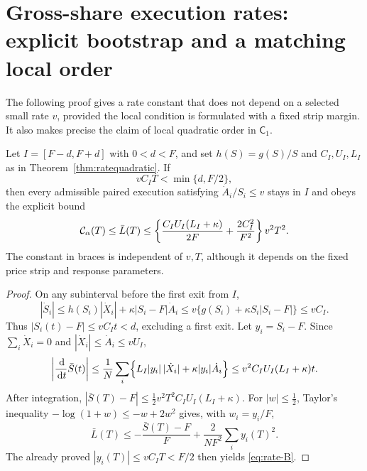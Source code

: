 \documentclass[review,hidelinks,onefignum,onetabnum]{siamonline250211}%
\begin{document}
\section{Gross-share execution rates: explicit bootstrap and a matching local order}
\label{app:rates}
The following proof gives a rate constant that does not depend
on a selected small rate $v$, provided the local condition is
formulated with a fixed strip margin. It also makes precise the
claim of local quadratic order in $\mathsf C_1$.

\begin{proposition}
\label{prop:rate-explicit}
Let $I=[F-d,F+d]$ with $0<d<F$, and set
$h(S)=g(S)/S$ and $C_I,U_I,L_I$ as in
Theorem~\ref{thm:ratequadratic}. If
\begin{equation}\label{eq:rate-small}
 v C_I T<\min\{d,F/2\},
\end{equation}
then every admissible paired execution satisfying
$\dot A_i/S_i\le v$ stays in $I$ and obeys the explicit bound
\begin{equation}\label{eq:rate-B}
 \mathcal{C}_\alpha(T)\le\bar L(T)\le
 \left\{\frac{C_IU_I(L_I+\kappa)}{2F}
           +\frac{2C_I^2}{F^2}\right\}v^2T^2.
\end{equation}
The constant in braces is independent of $v,T$, although it
depends on the fixed price strip and response parameters.
\end{proposition}
\begin{proof}
On any subinterval before the first exit from $I$,
\[
 |\dot S_i|\le h(S_i)|\dot X_i|
               +\kappa|S_i-F|\dot A_i
 \le v\{g(S_i)+\kappa S_i|S_i-F|\}\le v C_I.
\]
Thus $|S_i(t)-F|\le v C_I t<d$, excluding a first exit.
Let $y_i=S_i-F$. Since $\sum_i\dot X_i=0$ and
$|\dot X_i|\le\dot A_i\le vU_I$,
\[
 \left|\frac{\,\mathrm{d}}{\,\mathrm{d} t}\bar S(t)\right|
 \le\frac1N\sum_i
 \Bigl\{L_I|y_i|\,|\dot X_i|
             +\kappa|y_i|\dot A_i\Bigr\}
 \le v^2 C_I U_I(L_I+\kappa)t.
\]
After integration,
$|\bar S(T)-F|\le\tfrac12v^2T^2C_IU_I(L_I+\kappa)$.
For $|w|\le\tfrac12$, Taylor's inequality
$-\log(1+w)\le-w+2w^2$ gives, with $w_i=y_i/F$,
\[
 \bar L(T)\le-\frac{\bar S(T)-F}{F}
     +\frac{2}{NF^2}\sum_i y_i(T)^2.
\]
The already proved $|y_i(T)|\le vC_IT<F/2$
then yields \eqref{eq:rate-B}.
\end{proof}
\end{document}
